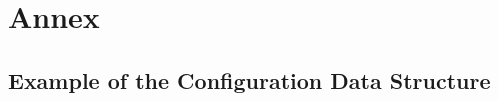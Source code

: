 \documentclass[letterpaper,10pt, openany,english]{sphinxmanual}
\begin{document}
\chapter{Annex}
\label{\detokenize{annex:annex}}\label{\detokenize{annex:sec-annex}}\label{\detokenize{annex::doc}}

\section{Example of the Configuration Data Structure}
\label{\detokenize{annex:example-of-the-configuration-data-structure}}\label{\detokenize{annex:sec-annex-json}}
\def\sphinxLiteralBlockLabel{\label{\detokenize{annex:code-conf-ahu}}}
\end{document}
